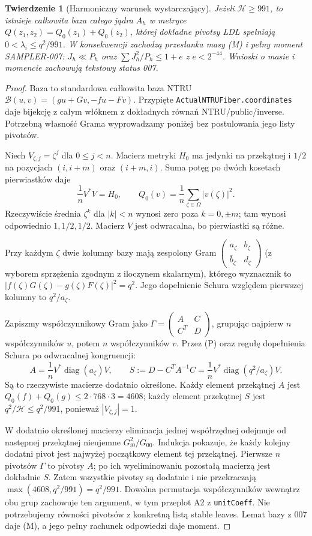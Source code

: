 \documentclass[11pt,a4paper]{article}
\newcommand{\code}[1]{\nolinkurl{#1}}
\newcommand{\HH}{\mathcal H}\newtheorem{theorem}{Twierdzenie}
\begin{document}
\begin{theorem}[Harmoniczny warunek wystarczający]
Jeżeli $\HH\ge991$, to istnieje całkowita baza całego jądra $A_h$
w metryce $Q(z_1,z_2)=Q_0(z_1)+Q_0(z_2)$, której dokładne pivotsy LDL
spełniają $0<\lambda_i\le q^2/991$. W konsekwencji zachodzą przesłanka
masy (M) i pełny moment SAMPLER-007: $J_h\ll P_h$ oraz
$\sum J_h^2/P_h\le1+e$ z $e<2^{-44}$.
Wnioski o masie i momencie zachowują tekstowy status 007.
\end{theorem}
\begin{proof}
Baza to standardowa całkowita baza NTRU
$\mathcal B(u,v)=(gu+Gv,-fu-Fv)$.
Przypięte \code{ActualNTRUFiber.coordinates} daje bijekcję z całym włóknem
z dokładnych równań NTRU/public/inverse. Potrzebną własność Grama wyprowadzamy
poniżej bez postulowania jego listy pivotsów.

Niech $V_{\zeta,j}=\zeta^j$ dla $0\le j<n$. Macierz metryki $H_0$ ma
jedynki na przekątnej i $1/2$ na pozycjach $(i,i+m)$ oraz $(i+m,i)$.
Suma potęg po dwóch kosetach pierwiastków daje
\[
 \frac1nV^*V=H_0,\qquad
 Q_0(v)=\frac1n\sum_{\zeta\in\Omega}|v(\zeta)|^2.       \tag{P}
\]
Rzeczywiście średnia $\zeta^k$ dla $|k|<n$ wynosi zero poza
$k=0,\pm m$; tam wynosi odpowiednio $1,1/2,1/2$.
Macierz $V$ jest odwracalna, bo pierwiastki są różne.

Przy każdym $\zeta$ dwie kolumny bazy mają zespolony Gram
$\begin{pmatrix}a_\zeta&b_\zeta\\\bar b_\zeta&d_\zeta\end{pmatrix}$
(z wyborem sprzężenia zgodnym z iloczynem skalarnym), którego wyznacznik
to $|f(\zeta)G(\zeta)-g(\zeta)F(\zeta)|^2=q^2$.
Jego dopełnienie Schura względem pierwszej kolumny to $q^2/a_\zeta$.

Zapiszmy współczynnikowy Gram jako
$\Gamma=\begin{pmatrix}A&C\\C^T&D\end{pmatrix}$, grupując najpierw
$n$ współczynników $u$, potem $n$ współczynników $v$.
Przez (P) oraz regułę dopełnienia Schura po odwracalnej kongruencji:
\[
 A=\frac1nV^*\operatorname{diag}(a_\zeta)V,\qquad
 S:=D-C^TA^{-1}C=\frac1nV^*\operatorname{diag}(q^2/a_\zeta)V. \tag{S}
\]
Są to rzeczywiste macierze dodatnio określone. Każdy element przekątnej
$A$ jest $Q_0(f)+Q_0(g)\le2\cdot768\cdot3=4608$;
każdy element przekątnej $S$ jest $q^2/\HH\le q^2/991$,
ponieważ $|V_{\zeta,j}|=1$.

W dodatnio określonej macierzy eliminacja jednej współrzędnej odejmuje
od następnej przekątnej nieujemne $G_{i0}^2/G_{00}$.
Indukcja pokazuje, że każdy kolejny dodatni pivot jest najwyżej
początkowy element tej przekątnej. Pierwsze $n$ pivotsów $\Gamma$ to
pivotsy $A$; po ich wyeliminowaniu pozostałą macierzą jest dokładnie $S$.
Zatem wszystkie pivotsy są dodatnie i nie przekraczają
$\max(4608,q^2/991)=q^2/991$. Dowolna permutacja współczynników
wewnątrz obu grup zachowuje ten argument, w tym przeplot A2 z \code{unitCoeff}.
Nie potrzebujemy równości pivotsów z konkretną listą stable leaves.
Lemat bazy z 007 daje (M), a jego pełny rachunek odpowiedzi daje moment.
\end{proof}
\end{document}
